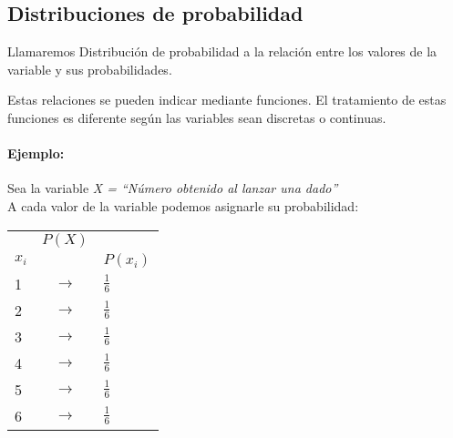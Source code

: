 \hypertarget{distribuciones-de-probabilidad-1}{%
\subsection{Distribuciones de
probabilidad}\label{distribuciones-de-probabilidad-1}}

Llamaremos Distribución de probabilidad a la relación entre los valores
de la variable y sus probabilidades.

Estas relaciones se pueden indicar mediante funciones. El tratamiento de
estas funciones es diferente según las variables sean discretas o
continuas.

\hypertarget{ejemplo-2}{%
\paragraph{Ejemplo:}\label{ejemplo-2}}

Sea la variable \emph{X = ``Número obtenido al lanzar una dado''}\\
A cada valor de la variable podemos asignarle su probabilidad:

\begin{longtable}[]{@{}lcl@{}}
\toprule
\endhead
& \(P(X)\) &\tabularnewline
\(x_i\) & & \(P(x_i)\)\tabularnewline
1 & \(\rightarrow\) & \(\tfrac{1}{6}\)\tabularnewline
2 & \(\rightarrow\) & \(\tfrac{1}{6}\)\tabularnewline
3 & \(\rightarrow\) & \(\tfrac{1}{6}\)\tabularnewline
4 & \(\rightarrow\) & \(\tfrac{1}{6}\)\tabularnewline
5 & \(\rightarrow\) & \(\tfrac{1}{6}\)\tabularnewline
6 & \(\rightarrow\) & \(\tfrac{1}{6}\)\tabularnewline
\bottomrule
\end{longtable}
